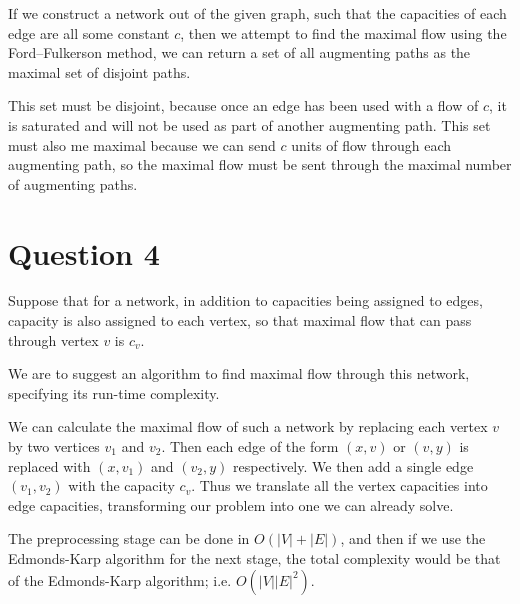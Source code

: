 \documentclass{article}
\begin{document}
If we construct a network out of the given graph, such that the capacities of each edge are all some constant \(c\), then we attempt to find the maximal flow using the Ford–Fulkerson method, we can return a set of all augmenting paths as the maximal set of disjoint paths.

This set must be disjoint, because once an edge has been used with a flow of \(c\), it is saturated and will not be used as part of another augmenting path. This set must also me maximal because we can send \(c\) units of flow through each augmenting path, so the maximal flow must be sent through the maximal number of augmenting paths.

\section*{Question 4}

Suppose that for a network, in addition to capacities being assigned to edges, capacity is also assigned to each vertex, so that maximal flow that can pass through vertex \(v\) is \(c_v\).

We are to suggest an algorithm to find maximal flow through this network, specifying its run-time complexity.

We can calculate the maximal flow of such a network by replacing each vertex \(v\) by two vertices \(v_1\) and \(v_2\). Then each edge of the form \((x, v)\) or \((v, y)\) is replaced with \((x, v_1)\) and \((v_2, y)\) respectively. We then add a single edge \((v_1, v_2)\) with the capacity \(c_v\). Thus we translate all the vertex capacities into edge capacities, transforming our problem into one we can already solve.

The preprocessing stage can be done in \(O(|V|+|E|)\), and then if we use the Edmonds-Karp algorithm for the next stage, the total complexity would be that of the Edmonds-Karp algorithm; i.e. \(O(|V||E|^2)\).
\end{document}
